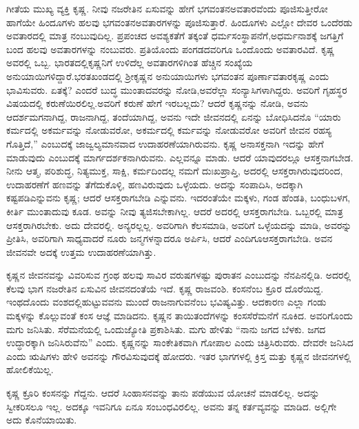 ಗೀತೆಯ ಮುಖ್ಯ ವ್ಯಕ್ತಿ ಕೃಷ್ಣ. ನೀವು ನಜರೇತಿನ ಏಸುವನ್ನು ಹೇಗೆ ಭಗವಂತನ\break ಅವತಾರವೆಂದು ಪೂಜಿಸುತ್ತೀರೋ ಹಾಗೆಯೇ ಹಿಂದೂಗಳು ಹಲವು ಭಗವಂತನ\break ಅವತಾರಗಳನ್ನು ಪೂಜಿಸುತ್ತಾರೆ. ಹಿಂದೂಗಳು ಎಲ್ಲೋ ದೇವರ ಒಂದೆರಡು ಅವತಾರದಲ್ಲಿ ಮಾತ್ರ ನಂಬುವುದಿಲ್ಲ. ಪ್ರಪಂಚದ ಅವಶ್ಯಕತೆಗೆ ತಕ್ಕಂತೆ ಧರ್ಮಸಂಸ್ಥಾಪನೆಗೆ,\break ಅಧರ್ಮನಾಶಕ್ಕೆ ಜಗತ್ತಿಗೆ ಬಂದ ಹಲವು ಅವತಾರಗಳನ್ನು ನಂಬುವರು. ಪ್ರತಿಯೊಂದು ಪಂಗಡದವರಿಗೂ ಒಂದೊಂದು ಅವತಾರವಿದೆ. ಕೃಷ್ಣ ಅವರಲ್ಲಿ ಒಬ್ಬ. ಭಾರತದಲ್ಲಿ\break ಕೃಷ್ಣನಿಗೆ ಉಳಿದೆಲ್ಲ ಅವತಾರಗಳಿಗಿಂತ ಹೆಚ್ಚಿನ ಸಂಖ್ಯೆಯ ಅನುಯಾಯಿಗಳಿದ್ದಾರೆ.\break ಭರತಖಂಡದಲ್ಲಿ ಶ‍್ರೀಕೃಷ್ಣನ ಅನುಯಾಯಿಗಳು ಭಗವಂತನ ಪೂರ್ಣಾವತಾರ\break ಕೃಷ್ಣ ಎಂದು ಭಾವಿಸುವರು. ಏತಕ್ಕೆ? ಎಂದರೆ ಬುದ್ಧ ಮುಂತಾದವರನ್ನು ನೋಡಿ,\break ಅವರೆಲ್ಲಾ ಸಂನ್ಯಾಸಿಗಳಾಗಿದ್ದರು. ಅವರಿಗೆ ಗೃಹಸ್ಥರ ವಿಷಯದಲ್ಲಿ ಕರುಣೆಯಿರಲಿಲ್ಲ.\break ಅವರಿಗೆ ಕರುಣೆ ಹೇಗೆ ಇರಬಲ್ಲದು? ಆದರೆ ಕೃಷ್ಣನನ್ನು ನೋಡಿ, ಅವನು ಆದರ್ಶ\break ಮಗನಾಗಿದ್ದ, ರಾಜನಾಗಿದ್ದ, ತಂದೆಯಾಗಿದ್ದ, ಅವನು ಇದೇ ಜೀವನದಲ್ಲಿ ಏನನ್ನು ಬೋಧಿಸಿದನೊ “ಯಾರು ಕರ್ಮದಲ್ಲಿ ಅಕರ್ಮವನ್ನು ನೋಡುವರೋ, ಅಕರ್ಮದಲ್ಲಿ ಕರ್ಮವನ್ನು ನೋಡುವರೋ ಅವರಿಗೆ ಜೀವನ ರಹಸ್ಯ ಗೊತ್ತಿದೆ,” ಎಂಬುದಕ್ಕೆ ಜಾಜ್ವಲ್ಯಮಾನವಾದ ಉದಾಹರಣೆಯಾಗಿರುವನು. ಕೃಷ್ಣ ಅನಾಸಕ್ತನಾಗಿ ಇದನ್ನು ಹೇಗೆ ಮಾಡುವುದು ಎಂಬುದಕ್ಕೆ ಮಾರ್ಗದರ್ಶಕನಾಗಿರುವನು. ಎಲ್ಲವನ್ನೂ ಮಾಡು. ಆದರೆ ಯಾವುದರಲ್ಲೂ ಆಸಕ್ತನಾಗಬೇಡ. ನೀನು ಆತ್ಮ, ಪರಿಶುದ್ಧ, ನಿತ್ಯಮುಕ್ತ, ಸಾಕ್ಷಿ, ಕರ್ಮದಿಂದಲ್ಲ ನಮಗೆ ದುಃಖಪ್ರಾಪ್ತಿ, ಅದರಲ್ಲಿ ಆಸಕ್ತರಾಗಿರುವುದರಿಂದ, ಉದಾಹರಣೆಗೆ ಹಣವನ್ನು ತೆಗೆದುಕೊಳ್ಳಿ, ಹಣವಿರುವುದು ಒಳ್ಳೆಯದು. ಅದನ್ನು ಸಂಪಾದಿಸಿ, ಅದಕ್ಕಾಗಿ ಕಷ್ಟಪಡಿ\break ಎನ್ನುವನು ಕೃಷ್ಣ; ಆದರೆ ಆಸಕ್ತರಾಗಬೇಡಿ ಎನ್ನುವನು. ಇದರಂತೆಯೇ ಮಕ್ಕಳು, ಗಂಡ ಹೆಂಡತಿ, ಬಂಧುಬಳಗ, ಕೀರ್ತಿ ಮುಂತಾದುವು ಕೂಡ. ಅವನ್ನು ನೀವು ತ್ಯಜಿಸಬೇಕಾಗಿಲ್ಲ. ಆದರೆ ಅದರಲ್ಲಿ ಆಸಕ್ತರಾಗಬೇಡಿ. ಒಬ್ಬರಲ್ಲಿ ಮಾತ್ರ ಆಸಕ್ತರಾಗಿರಬೇಕು. ಅದು ದೇವರಲ್ಲಿ. ಅನ್ಯರಲ್ಲಲ್ಲ. ಅವರಿಗಾಗಿ ಕೆಲಸಮಾಡಿ, ಅವರಿಗೆ ಒಳ್ಳೆಯದನ್ನು ಮಾಡಿ, ಅವರನ್ನು ಪ್ರೀತಿಸಿ, ಅವರಿಗಾಗಿ ಸಾಧ್ಯವಾದರೆ ನೂರು ಜನ್ಮಗಳನ್ನಾದರೂ ಅರ್ಪಿಸಿ, ಆದರೆ ಎಂದಿಗೂ\break ಆಸಕ್ತರಾಗಬೇಡಿ. ಅವನ ಜೀವನವೇ ಅದಕ್ಕೆ ಉತ್ತಮ ಉದಾಹರಣೆಯಾಗಿತ್ತು.

\vskip 0.2cm

ಕೃಷ್ಣನ ಜೀವನವನ್ನು ವಿವರಿಸುವ ಗ್ರಂಥ ಹಲವು ಸಾವಿರ ವರುಷಗಳಷ್ಟು ಪುರಾತನ ಎಂಬುದನ್ನು ನೆನಪಿನಲ್ಲಿಡಿ. ಅದರಲ್ಲಿ ಕೆಲವು ಭಾಗ ನಜರೇತಿನ ಏಸುವಿನ ಜೀವನದಂತೆಯೆ ಇದೆ. ಕೃಷ್ಣ ರಾಜವಂಶಿ. ಕಂಸನೆಂಬ ಕ್ರೂರ ದೊರೆಯಿದ್ದ. ಇಂಥದೊಂದು ವಂಶದಲ್ಲಿ\break ಹುಟ್ಟುವವನು ಮುಂದೆ ರಾಜನಾಗುವನೆಂಬ ಭವಿಷ್ಯವಿತ್ತು. ಆದಕಾರಣ ಎಲ್ಲಾ ಗಂಡು ಮಕ್ಕಳನ್ನು ಕೊಲ್ಲುವಂತೆ ಕಂಸ ಆಜ್ಞೆ ಮಾಡಿದನು. ಕೃಷ್ಣನ ತಾಯಿತಂದೆಗಳನ್ನು ಕಂಸ\break ಸೆರೆಮನೆಗೆ ನೂಕಿದ. ಅವರಿಗೊಂದು ಮಗು ಜನಿಸಿತು. ಸೆರೆಮನೆಯಲ್ಲಿ ಒಂದು\break ಜ್ಯೋತಿ ಪ್ರಕಾಶಿಸಿತು. ಮಗು ಹೇಳಿತು “ನಾನು ಜಗದ ಬೆಳಕು. ಜಗದ ಉದ್ಧಾರಕ್ಕಾಗಿ ಜನಿಸಿರುವೆನು” ಎಂದು. ಕೃಷ್ಣನನ್ನು ಸಾಂಕೇತಿಕವಾಗಿ ಗೋಪಾಲ ಎಂದು ಚಿತ್ರಿಸಿರುವರು. ದೇವರೇ ಜನಿಸಿದ ಎಂದು ಋಷಿಗಳು ಹೇಳಿ ಅವನನ್ನು ಗೌರವಿಸುವುದಕ್ಕೆ ಹೋದರು. ಇತರ ಭಾಗಗಳಲ್ಲಿ ಕ್ರಿಸ್ತ ಮತ್ತು ಕೃಷ್ಣನ ಜೀವನಗಳಲ್ಲಿ ಹೋಲಿಕೆಯಿಲ್ಲ.

\vskip 0.2cm

ಕೃಷ್ಣ ಕ್ರೂರಿ ಕಂಸನನ್ನು ಗೆದ್ದನು. ಆದರೆ ಸಿಂಹಾಸನವನ್ನು ತಾನು ಪಡೆಯುವ ಯೋಚನೆ ಮಾಡಲಿಲ್ಲ. ಅದನ್ನು ಸ್ವೀಕರಿಸಲೂ ಇಲ್ಲ. ಅದಕ್ಕೂ ಇವನಿಗೂ ಏನೂ ಸಂಬಂಧ\-ವಿರಲಿಲ್ಲ. ಅವನು ತನ್ನ ಕರ್ತವ್ಯವನ್ನು ಮಾಡಿದ. ಅಲ್ಲಿಗೇ ಅದು ಕೊನೆಯಾಯಿತು.

